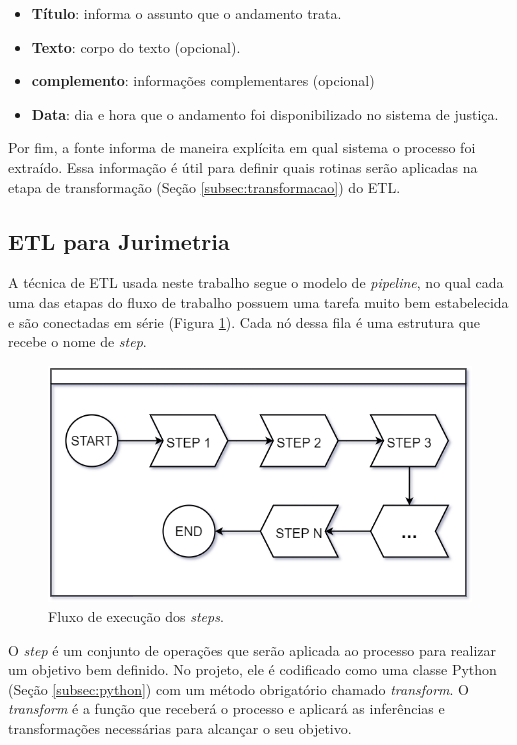 \begin{itemize}
    \item \textbf{Título}: informa o assunto que o andamento trata.
    \item \textbf{Texto}: corpo do texto (opcional).
    \item \textbf{complemento}: informações complementares (opcional)
    \item \textbf{Data}: dia e hora que o andamento foi disponibilizado no sistema de justiça.
\end{itemize}

Por fim, a fonte informa de maneira explícita em qual sistema o processo foi extraído. Essa informação é útil para definir quais rotinas serão aplicadas na etapa de transformação (Seção \ref{subsec:transformacao}) do ETL.


\subsection{ETL para Jurimetria}
\label{jurimetria}

A técnica de ETL usada neste trabalho segue o modelo de \textit{pipeline}, no qual cada uma das etapas do fluxo de trabalho possuem uma tarefa muito bem estabelecida e são conectadas em série (Figura \ref{fig:stepsFlow}). Cada nó dessa fila é uma estrutura que recebe o nome de \textit{step}.

\begin{figure}[ht]
\centering
\includegraphics[width=1\textwidth]{imagens/steps-flow.png}
\caption{Fluxo de execução dos \textit{steps}.}
\label{fig:stepsFlow}
\end{figure}

O \textit{step} é um conjunto de operações que serão aplicada ao processo para realizar um objetivo bem definido. No projeto, ele é codificado como uma classe Python (Seção \ref{subsec:python}) com um método obrigatório chamado \textit{transform}. O \textit{transform} é a função que receberá o processo e aplicará as inferências e transformações necessárias para alcançar o seu objetivo.

